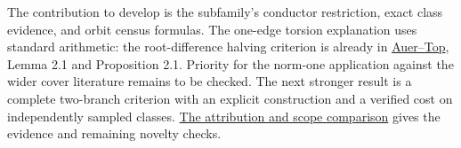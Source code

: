 \documentclass[11pt]{article}
\begin{document}
The contribution to develop is the subfamily's conductor restriction,
exact class evidence, and orbit census formulas. The one-edge torsion
explanation uses standard arithmetic: the root-difference halving
criterion is already in
\href{https://pure.rug.nl/ws/portalfiles/portal/14410242/2002JNumberThAuer.pdf}{Auer--Top},
Lemma 2.1 and Proposition 2.1. Priority for the norm-one application
against the wider cover literature remains to be checked.
The next stronger result is a complete two-branch criterion with an
explicit construction and a verified cost on independently sampled classes.
\href{PRIOR_WORK.md}{The attribution and scope comparison} gives the
evidence and remaining novelty checks.
\end{document}
